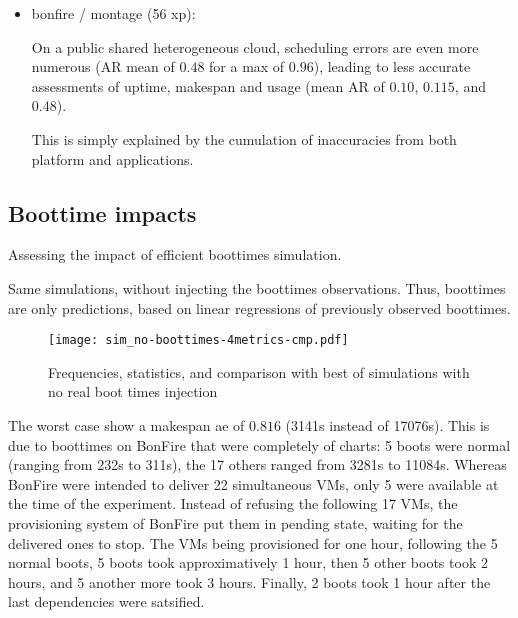 \documentclass[parallelisme]{compas2017}
\newcommand\vrpath{../../lab/setup/simschlouder/validation-results/}
\begin{document}
\begin{itemize}
 \item bonfire / montage (56 xp): 
 
      
      
      
 
      On a public shared heterogeneous cloud, scheduling errors are even more numerous 
      (AR mean of $0.48$ for a max of $0.96$), leading to less accurate assessments
      of uptime, makespan and usage (mean AR of $0.10$, $0.115$, and $0.48$).
      
      This is simply explained by the cumulation of inaccuracies from 
      both platform and applications. 
\end{itemize}



\subsection{Boottime impacts}

Assessing the impact of efficient boottimes simulation.

Same simulations, without injecting the boottimes observations. 
Thus, boottimes are only predictions, based on linear regressions of previously
observed boottimes.

\begin{figure}
  \centering
  \texttt{[image: sim\_no-boottimes-4metrics-cmp.pdf]}

  

  

  

  \caption{Frequencies, statistics, and comparison with best of simulations with no real boot times 
  injection}

\end{figure} 

The worst case show a makespan ae of $0.816$ (3141s instead of 17076s). 
This is due to boottimes on BonFire that were completely of charts: 
5 boots were normal (ranging from 232s to 311s), 
the 17 others ranged from 3281s to 11084s.
Whereas BonFire were intended to deliver 22 simultaneous VMs, only 5 were available
at the time of the experiment. Instead of refusing the following 17 VMs, the
provisioning system of BonFire put them in pending state, waiting for the delivered
ones to stop. The VMs being provisioned for one hour, following the 5 normal boots, 
5 boots took approximatively 1 hour, then 5 other boots took 2 hours,
and 5 another more took 3 hours. Finally, 2 boots took 1 hour after the last 
dependencies were satsified.
\end{document}
